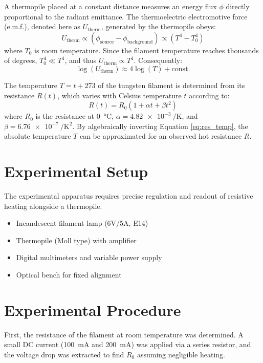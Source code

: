 \documentclass[journal]{IEEEtran}
\begin{document}
A thermopile placed at a constant distance measures an energy flux $\phi$ directly proportional to the radiant emittance. The thermoelectric electromotive force (e.m.f.), denoted here as $U_{\text{therm}}$, generated by the thermopile obeys:
\begin{equation}
    U_{\text{therm}} \propto (\phi_{\text{source}} - \phi_{\text{background}}) \propto (T^4 - T_0^4)
\end{equation}
where $T_0$ is room temperature. Since the filament temperature reaches thousands of degrees, $T_0^4 \ll T^4$, and thus $U_{\text{therm}} \propto T^4$. Consequently:
\begin{equation}
    \log(U_{\text{therm}}) \approx 4 \log(T) + \text{const.} \label{eq:log_law}
\end{equation}

The temperature $T = t + 273$ of the tungsten filament is determined from its resistance $R(t)$, which varies with Celsius temperature $t$ according to:
\begin{equation}
    R(t) = R_0 \left(1 + \alpha t + \beta t^2\right) \label{eq:res_temp}
\end{equation}
where $R_0$ is the resistance at \SI{0}{\celsius}, $\alpha = \SI{4.82e-3}{\per\K}$, and $\beta = \SI{6.76e-7}{\per\K\squared}$. By algebraically inverting Equation \eqref{eq:res_temp}, the absolute temperature $T$ can be approximated for an observed hot resistance $R$.

\section{Experimental Setup}
The experimental apparatus requires precise regulation and readout of resistive heating alongside a thermopile. 
\begin{itemize}
    \item Incandescent filament lamp (6V/5A, E14) 
    \item Thermopile (Moll type) with amplifier
    \item Digital multimeters and variable power supply
    \item Optical bench for fixed alignment
\end{itemize}

\section{Experimental Procedure}
First, the resistance of the filament at room temperature was determined. A small DC current (\SI{100}{\mA} and \SI{200}{\mA}) was applied via a series resistor, and the voltage drop was extracted to find $R_0$ assuming negligible heating. 
\end{document}
